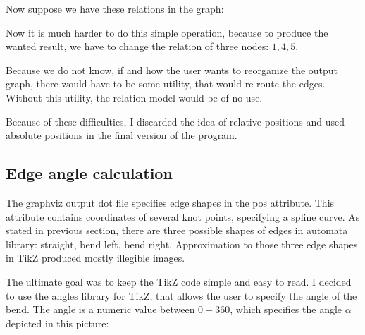 \documentclass{ctuthesis}
\begin{document}
Now suppose we have these relations in the graph:
\begin{figure}[H]
\centering
{}
\end{figure}

Now it is much harder to do this simple operation, because to produce the wanted result, we have to change the relation of three nodes: $1, 4, 5$. 

Because we do not know, if and how the user wants to reorganize the output graph, there would have to be some utility, that would re-route the edges. Without this utility, the relation model would be of no use.

Because of these difficulties, I discarded the idea of relative positions and used absolute positions in the final version of the program.

\subsection{Edge angle calculation}
\label{subsec:edge-angle}
The graphviz output dot file specifies edge shapes in the pos attribute. This attribute contains coordinates of several knot points, specifying a spline curve. As stated in previous section, there are three possible shapes of edges in automata library: straight, bend left, bend right. Approximation to those three edge shapes in TikZ produced mostly illegible images. 

The ultimate goal was to keep the TikZ code simple and easy to read. I decided to use the angles library for TikZ, that allows the user to specify the angle of the bend. The angle is a numeric value between $0-360$, which specifies the angle $\alpha$ depicted in this picture:

\begin{figure}[H]
\end{figure}
\end{document}
